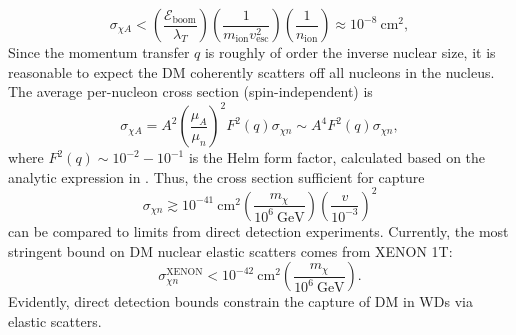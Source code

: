 \documentclass[preprintnumbers,amsmath,amssymb,prd,superscriptaddress]{revtex4}
\newcommand{\Eboom}{\mathcal{E}_\text{boom}}
\newcommand{\GeV}{\text{GeV}}
\newcommand{\cm}{\text{cm}}
\def\r{\right)}
\def\l{\left(}
\begin{document}
\begin{equation}
\sigma_{\chi A} < \l \frac{\Eboom}{\lambda_T} \r \l \frac{1}{m_\text{ion} v_\text{esc}^2} \r \l \frac{1}{n_\text{ion}} \r \approx 10^{-8} ~\cm^2,
\end{equation}
Since the momentum transfer $q$ is roughly of order the inverse nuclear size, it is reasonable to expect the DM coherently scatters off all nucleons in the nucleus. 
The average per-nucleon cross section (spin-independent) is
\begin{equation}
\sigma_{\chi A} = A^2 \l \frac{\mu_{A}}{\mu_{n}}\r^2 F^2(q) \sigma_{\chi n} \sim A^4 F^2(q) \sigma_{\chi n},
\end{equation}
where $F^2(q) \sim 10^{-2}-10^{-1}$ is the Helm form factor, calculated based on the analytic expression in \cite{LUX thesis}. 
Thus, the cross section sufficient for capture
\begin{equation}
\sigma_{\chi n} \gtrsim 10^{-41} ~\cm^2 \l \frac{m_\chi}{10^{6} ~\GeV} \r \l \frac{v}{10^{-3}} \r^2
\end{equation}
can be compared to limits from direct detection experiments. 
Currently, the most stringent bound on DM nuclear elastic scatters comes from XENON 1T:
\begin{equation}
\label{eq:xenon}
\sigma^\text{XENON}_{\chi n} < 10^{-42} ~\text{cm}^2 \l \frac{m_\chi}{10^6 ~\GeV} \r.
\end{equation}
Evidently, direct detection bounds constrain the capture of DM in WDs via elastic scatters.
\end{document}
